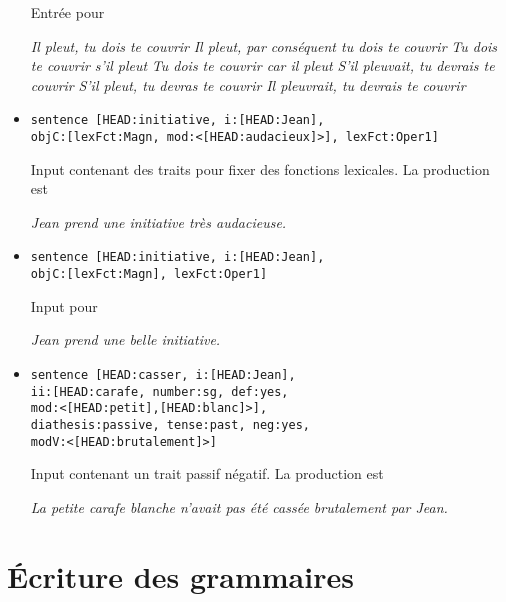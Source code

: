\documentclass[11pt]{article}
\begin{document}
\begin{itemize}
Entrée pour 
\begin{exe}
\ex \begin{xlist} 
\ex \textit{Il pleut, tu dois te couvrir}
\ex \textit{Il pleut, par conséquent tu dois te couvrir}
\ex \textit{Tu dois te couvrir s'il pleut}
\ex \textit{Tu dois te couvrir car il pleut}
\ex \textit{S'il pleuvait, tu devrais te couvrir}
\ex \textit{S'il pleut, tu devras te couvrir}
\ex \textit{Il pleuvrait, tu devrais te couvrir}
\end{xlist}
\end{exe}

\item 
\begin{verbatim}
sentence [HEAD:initiative, i:[HEAD:Jean], 
objC:[lexFct:Magn, mod:<[HEAD:audacieux]>], lexFct:Oper1]
\end{verbatim}

Input contenant des traits pour fixer des fonctions lexicales. La
production est 
\begin{exe}
\ex \textit{Jean prend une initiative très audacieuse.}
\end{exe}

\item 
\begin{verbatim}
sentence [HEAD:initiative, i:[HEAD:Jean], 
objC:[lexFct:Magn], lexFct:Oper1]
\end{verbatim}

Input pour

\begin{exe}
\ex \textit{Jean prend une belle initiative.}
\end{exe}

\item 
\begin{verbatim}
sentence [HEAD:casser, i:[HEAD:Jean], 
ii:[HEAD:carafe, number:sg, def:yes, 
mod:<[HEAD:petit],[HEAD:blanc]>], 
diathesis:passive, tense:past, neg:yes, 
modV:<[HEAD:brutalement]>]
\end{verbatim}

Input contenant un trait passif négatif. La
production est
\begin{exe}
\ex \textit{La petite carafe blanche n'avait pas été cassée
brutalement par Jean.}
\end{exe}

\end{itemize}

\section{Écriture des grammaires}
\end{document}
